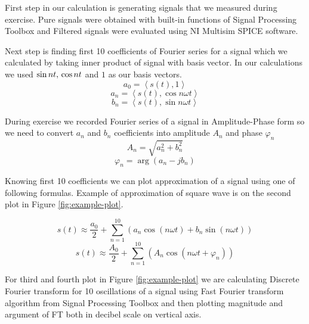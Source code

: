 \documentclass[notitlepage, a4paper, 11pt]{article}
\begin{document}
	First step in our calculation is generating signals that we measured during exercise. Pure signals were obtained with built-in functions of Signal Processing Toolbox and Filtered signals were evaluated using NI Multisim SPICE software.
		
	Next step is finding first 10 coefficients of Fourier series for a signal which we calculated by taking inner product of signal with basis vector. In our calculations we used $\sin nt ,\thinspace \cos nt$ and $1$ as our basis vectors.
	\begin{equation}\label{eq:a0}
		a_0 = \left\langle s(t), 1 \right\rangle
	\end{equation}
	\begin{equation}\label{eq:an}
		a_n = \left\langle s(t), \cos n\omega t \right\rangle
	\end{equation}
	\begin{equation}\label{eq:bn}
		b_n = \left\langle s(t), \sin n\omega t \right\rangle
	\end{equation}

	During exercise we recorded Fourier series of a signal in Amplitude-Phase form so we need to convert $a_n$ and $b_n$ coefficients into amplitude $A_n$ and phase $\varphi_n$
	\begin{equation}\label{eq:An}
		A_n = \sqrt{a_n^2 + b_n^2}
	\end{equation}
	\begin{equation}\label{eq:phi}
		\varphi_n = \arg(a_n - j b_n)
	\end{equation}
		
	Knowing first 10 coefficients we can plot approximation of a signal using one of following formulas. Example of approximation of square wave is on the second plot in Figure \ref{fig:example-plot}.
	
	\begin{equation}\label{eq:FS}
		s(t) \approx \frac{a_0}{2} + \sum_{n=1}^{10}(a_n\cos(n\omega t)+b_n\sin(n\omega t))
	\end{equation}
	\begin{equation}\label{eq:FSap}
		s(t) \approx \frac{A_0}{2} + \sum_{n=1}^{10}(A_n\cos(n\omega t +\varphi_n))
	\end{equation}

	For third and fourth plot in Figure \ref{fig:example-plot} we are calculating Discrete Fourier transform for 10 oscillations of a signal using Fast Fourier transform algorithm from Signal Processing Toolbox and then plotting magnitude and argument of FT both in decibel scale on vertical axis.
\end{document}

